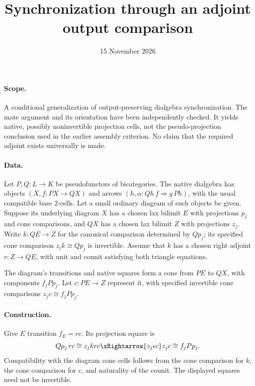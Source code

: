 \documentclass{article}
\title{Synchronization through an adjoint output comparison}
\date{15 November 2026}
\begin{document}
\maketitle
\paragraph{Scope.} A conditional generalization of output-preserving dialgebra synchronization. The mate argument and its orientation have been independently checked. It yields native, possibly noninvertible projection cells, not the pseudo-projection conclusion used in the earlier assembly criterion. No claim that the required adjoint exists universally is made.

\paragraph{Data.} Let $P,Q:L\to K$ be pseudofunctors of bicategories. The native dialgebra has objects $(X,f:PX\to QX)$ and arrows $(h,\alpha:Qh\,f\Rightarrow g\,Ph)$, with the usual compatible base 2-cells. Let a small ordinary diagram of such objects be given. Suppose its underlying diagram $X$ has a chosen lax bilimit $E$ with projections $p_j$ and cone comparisons, and $QX$ has a chosen lax bilimit $Z$ with projections $z_j$. Write $k:QE\to Z$ for the canonical comparison determined by $Qp_j$; its specified cone comparison $z_jk\cong Qp_j$ is invertible. Assume that $k$ has a chosen right adjoint $r:Z\to QE$, with unit and counit satisfying both triangle equations.

The diagram's transitions and native squares form a cone from $PE$ to $QX$, with components $f_jPp_j$. Let $c:PE\to Z$ represent it, with specified invertible cone comparisons $z_jc\cong f_jPp_j$.

\paragraph{Construction.} Give $E$ transition $f_E=rc$. Its projection square is
\[
 Qp_j\,rc\cong z_j krc\xRightarrow{z_j\epsilon c}z_jc\cong f_jPp_j.
\]
Compatibility with the diagram cone cells follows from the cone comparison for $k$, the cone comparison for $c$, and naturality of the counit. The displayed squares need not be invertible.
\end{document}
